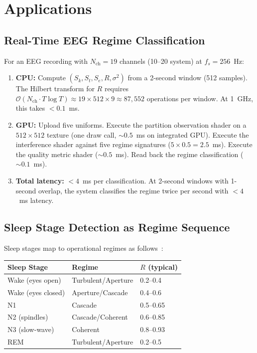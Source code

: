 \documentclass[11pt,twocolumn,a4paper]{article}
\newcommand{\Sk}{S_k}
\newcommand{\St}{S_t}
\newcommand{\Se}{S_e}
\newcommand{\BigO}{\mathcal{O}}
\begin{document}

\section{Applications}
\label{sec:applications}

\subsection{Real-Time EEG Regime Classification}

For an EEG recording with $N_{\mathrm{ch}} = 19$ channels (10--20 system) at $f_s = 256$~Hz:

\begin{enumerate}[leftmargin=*,itemsep=2pt]
\item \textbf{CPU:} Compute $(\Sk, \St, \Se, R, \sigma^2)$ from a 2-second window (512 samples).
The Hilbert transform for $R$ requires $\BigO(N_{\mathrm{ch}} \cdot T \log T) \approx 19 \times 512 \times 9 \approx 87{,}552$ operations per window.
At 1~GHz, this takes $<0.1$~ms.

\item \textbf{GPU:} Upload five uniforms.
Execute the partition observation shader on a $512 \times 512$ texture (one draw call, $\sim\!0.5$~ms on integrated GPU).
Execute the interference shader against five regime signatures ($5 \times 0.5 = 2.5$~ms).
Execute the quality metric shader ($\sim\!0.5$~ms).
Read back the regime classification ($\sim\!0.1$~ms).

\item \textbf{Total latency:} $< 4$~ms per classification.
At 2-second windows with 1-second overlap, the system classifies the regime twice per second with $<4$~ms latency.
\end{enumerate}

\subsection{Sleep Stage Detection as Regime Sequence}

Sleep stages map to operational regimes as follows~\cite{sachikonye2026regime,berry2017,steriade1993}:

\begin{center}
\begin{tabular}{lll}
\toprule
Sleep Stage & Regime & $R$ (typical) \\
\midrule
Wake (eyes open) & Turbulent/Aperture & 0.2--0.4 \\
Wake (eyes closed) & Aperture/Cascade & 0.4--0.6 \\
N1 & Cascade & 0.5--0.65 \\
N2 (spindles) & Cascade/Coherent & 0.6--0.85 \\
N3 (slow-wave) & Coherent & 0.8--0.93 \\
REM & Turbulent/Aperture & 0.2--0.5 \\
\bottomrule
\end{tabular}
\end{center}
\end{document}
